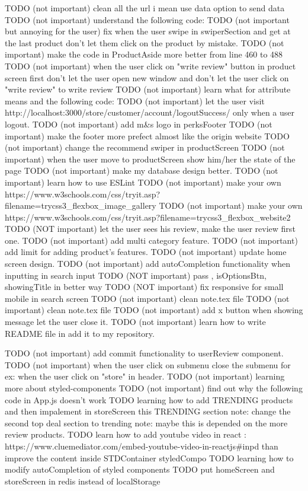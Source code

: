 TODO (not important) clean all the url i mean use data option to send data 
TODO (not important) understand the following code:
TODO (not important but annoying for the user) fix when the user swipe in swiperSection and get at the last product don't let them click on the product by mistake.
TODO (not important) make the code in ProductAside more better from line 460 to 488
TODO (not important) when the user click on "write review" button in product screen first don't let the user open new window and don't let the user click on "write review" to write review
TODO (not important) learn what for attribute means and the following code:
TODO (not important) let the user visit http://localhost:3000/store/customer/account/logoutSuccess/ only when a user logout.
TODO (not important) add m&s logo in perksFooter
TODO (not important) make the footer more prefect almost like the origin website
TODO (not important) change the recommend swiper in productScreen
TODO (not important) when the user move to productScreen show him/her the state of the page
TODO (not important) make my database design better.
TODO (not important) learn how to use ESLint
TODO (not important) make your own https://www.w3schools.com/css/tryit.asp?filename=trycss3_flexbox_image_gallery
TODO (not important) make your own https://www.w3schools.com/css/tryit.asp?filename=trycss3_flexbox_website2
TODO (NOT important) let the user sees his review, make the user review first one.
TODO (not important) add multi category feature.
TODO (not important) add limit for adding product's features. 
TODO (not important) update home screen design.
TODO (not important) add autoCompletion functionality when inputting in search input
TODO (NOT important) pass , isOptionsBtn, showingTitle in better way 
TODO (NOT important) fix responsive for small mobile in search screen
TODO (not important) clean note.tex file
TODO (not important) clean note.tex file
TODO (not important) add x button when showing message let the user close it. 
TODO (not important) learn how to write README file in add it to my repository.

TODO (not important) add commit functionality to userReview component.
TODO (not important) when the user click on submenu close the submenu for ex: when the user click on "store" in header.
TODO (not important) learning more about styled-components
TODO (not important) find out why the following code in App.js doesn't work
TODO   learning how to add TRENDING products and then impalement in storeScreen this TRENDING section
      note: change the second top deal section to trending 
      note: maybe this is depended on the more review products.
TODO learn how to add youtube video in react : 
https://www.cluemediator.com/embed-youtube-video-in-reactjs#inpd
than improve the content inside STDContainer styledCompo 
TODO   learning how to modify autoCompletion of styled components 
TODO put homeScreen and storeScreen in redis instead of localStorage